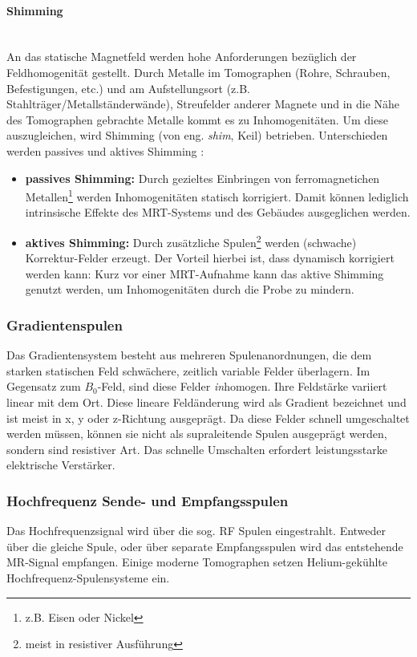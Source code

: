 \paragraph{Shimming}\mbox{}\\
An das statische Magnetfeld werden hohe Anforderungen bezüglich der Feldhomogenität gestellt.
Durch Metalle im Tomographen (Rohre, Schrauben, Befestigungen, etc.) und am Aufstellungsort (z.B. Stahlträger/Metallständerwände), Streufelder anderer Magnete und in die Nähe des Tomographen gebrachte Metalle kommt es zu Inhomogenitäten.
Um diese auszugleichen, wird Shimming (von eng. \textit{shim}, Keil) betrieben. Unterschieden werden passives und aktives Shimming \cite{Lipton2008}:
\begin{itemize}
	\item \textbf{passives Shimming:} Durch gezieltes Einbringen von ferromagnetichen Metallen\footnote{z.B. Eisen oder Nickel} werden Inhomogenitäten statisch korrigiert. Damit können lediglich intrinsische Effekte des MRT-Systems und des Gebäudes ausgeglichen werden.
	\item \textbf{aktives Shimming:} Durch zusätzliche Spulen\footnote{meist in resistiver Ausführung} werden (schwache) Korrektur-Felder erzeugt. Der Vorteil hierbei ist, dass dynamisch korrigiert werden kann: Kurz vor einer MRT-Aufnahme kann das aktive Shimming genutzt werden, um Inhomogenitäten  durch die Probe zu mindern.  
\end{itemize}

\subsubsection{Gradientenspulen}
Das Gradientensystem besteht aus mehreren Spulenanordnungen, die dem starken statischen Feld schwächere, zeitlich variable Felder überlagern. Im Gegensatz zum $B_0$-Feld, sind diese Felder \textit{in}homogen. Ihre Feldstärke variiert linear mit dem Ort. Diese lineare Feldänderung wird als Gradient bezeichnet und ist meist in x, y oder z-Richtung ausgeprägt. Da diese Felder schnell umgeschaltet werden müssen, können sie nicht als supraleitende Spulen ausgeprägt werden, sondern sind resistiver Art. Das schnelle Umschalten erfordert leistungsstarke elektrische Verstärker.

\subsubsection{Hochfrequenz Sende- und Empfangsspulen}
Das Hochfrequenzsignal wird über die sog. RF Spulen eingestrahlt. Entweder über die gleiche Spule, oder über separate Empfangsspulen wird das entstehende MR-Signal empfangen. Einige moderne Tomographen setzen Helium-gekühlte Hochfrequenz-Spulensysteme ein.

